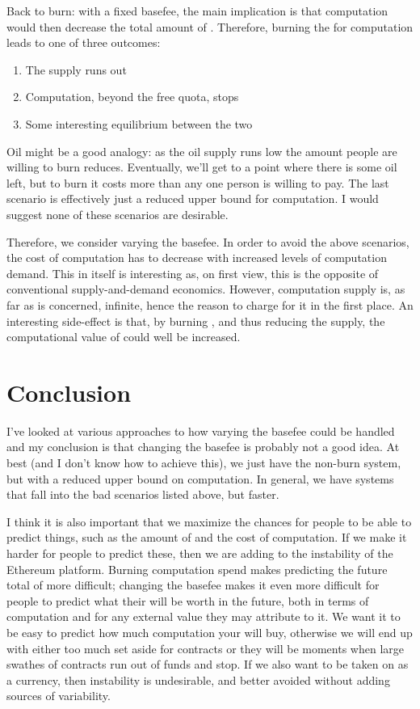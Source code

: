 \documentclass[11pt,a4paper]{article}
\begin{document}
Back to \ether burn: with a fixed basefee, the main implication is that computation would then decrease the total amount of \ether. Therefore, burning the \ether for computation leads to one of three outcomes:
\begin{enumerate} \itemsep=0pt
\item The \ether supply runs out
\item Computation, beyond the free quota, stops
\item Some interesting equilibrium between the two
\end{enumerate}
Oil might be a good analogy: as the oil supply runs low the amount people are willing to burn reduces. Eventually, we'll get to a point where there is some oil left, but to burn it costs more than any one person is willing to pay. The last scenario is effectively just a reduced upper bound for computation. I would suggest none of these scenarios are desirable.

Therefore, we consider varying the basefee. In order to avoid the above scenarios, the \ether cost of computation has to decrease with increased levels of computation demand. This in itself is interesting as, on first view, this is the opposite  of conventional supply-and-demand economics. However, computation supply is, as far as \ether is concerned, infinite, hence the reason to charge for it in the first place. An interesting side-effect is that, by burning \ether, and thus reducing the supply, the computational value of \ether could well be increased. 

\section*{Conclusion}

I've looked at various approaches to how varying the basefee could be handled and my conclusion is that changing the basefee is probably not a good idea. At best (and I don't know how to achieve this), we just have the non-burn system, but with a reduced upper bound on computation. In general, we have systems that fall into the bad scenarios listed above, but faster.

I think it is also important that we maximize the chances for people to be able to predict things, such as the amount of \ether and the cost of computation. If we make it harder for people to predict these, then we are adding to the instability of the Ethereum platform. Burning computation spend makes predicting the future total of \ether more difficult; changing the basefee makes it even more difficult for people to predict what their \ether will be worth in the future, both in terms of computation and for any external value they may attribute to it. We want it to be easy to predict how much computation your \ether will buy, otherwise we will end up with either too much set aside for contracts or they will be moments when large swathes of contracts run out of funds and stop. If we also want \ether to be taken on as a currency, then instability is undesirable, and better avoided without adding sources of variability.
 
\end{document}
